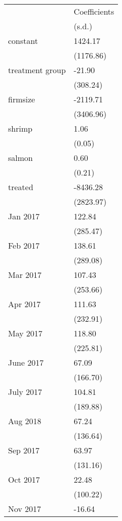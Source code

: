 \begin{tabular}{ll}
\toprule
{} & Coefficients \\
{} &       (s.d.) \\
\midrule
constant        &      1424.17 \\
                &    (1176.86) \\
treatment group &       -21.90 \\
                &     (308.24) \\
firmsize        &     -2119.71 \\
                &    (3406.96) \\
shrimp          &         1.06 \\
                &       (0.05) \\
salmon          &         0.60 \\
                &       (0.21) \\
treated         &     -8436.28 \\
                &    (2823.97) \\
Jan 2017        &       122.84 \\
                &     (285.47) \\
Feb 2017        &       138.61 \\
                &     (289.08) \\
Mar 2017        &       107.43 \\
                &     (253.66) \\
Apr 2017        &       111.63 \\
                &     (232.91) \\
May 2017        &       118.80 \\
                &     (225.81) \\
June 2017       &        67.09 \\
                &     (166.70) \\
July 2017       &       104.81 \\
                &     (189.88) \\
Aug 2018        &        67.24 \\
                &     (136.64) \\
Sep 2017        &        63.97 \\
                &     (131.16) \\
Oct 2017        &        22.48 \\
                &     (100.22) \\
Nov 2017        &       -16.64 \\

\end{tabular}
